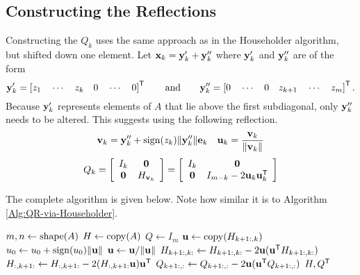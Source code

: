 \subsection*{Constructing the Reflections} %

Constructing the $Q_k$ uses the same approach as in the Householder algorithm, but shifted down one element.
Let $\mathbf{x}_k = \mathbf{y}_k' + \mathbf{y}_k''$ where $\mathbf{y}_k'$ and $\mathbf{y}_k''$ are of the form
\[
\mathbf{y}_k' = \left[z_1\quad \cdots\quad z_k\quad 0\quad \cdots\quad 0\right]^{\mathsf T}
\qquad\text{and}\qquad
\mathbf{y}_k'' = \left[0\quad\cdots\quad 0\quad z_{k+1}\quad\cdots\quad z_m\right]^{\mathsf T}.
\]
Because $\mathbf{y}_k'$ represents elements of $A$ that lie above the first subdiagonal, only $\mathbf{y}_k''$ needs to be altered.
This suggests using the following reflection.
%
\begin{align*}
\mathbf{v}_k = \mathbf{y}_k'' + \operatorname{sign}(z_k)\|\mathbf{y}_k''\| \mathbf{e}_k
&&
\mathbf{u}_k = \frac{\mathbf{v}_k}{\|\mathbf{v}_k\|}
\end{align*}
\[
Q_k =
\left[\begin{array}{cc}
I_k & \mathbf{0} \\
\mathbf{0}      & H_{\mathbf{v}_k} \\
\end{array}\right] =
\left[\begin{array}{cc}
I_k & \mathbf{0} \\
\mathbf{0}      & I_{m-k} - 2 \mathbf{u}_k\mathbf{u}_k^{\mathsf T} \\
\end{array}\right]
\]

The complete algorithm is given below.
Note how similar it is to Algorithm \ref{Alg:QR-via-Householder}.

\begin{algorithm}[H]
\begin{algorithmic}[1]
    \State $m, n \gets \mathrm{shape}(A)$
    \State $H \gets \mathrm{copy}(A)$
    \State $Q \gets I_{m}$
        \State $\mathbf{u} \gets \mathrm{copy}(H_{k+1:,k})$
        \State $u_0 \gets u_0 + \operatorname{sign}(u_0)\|\mathbf{u}\|$
        \State $\mathbf{u} \gets \mathbf{u}/\|\mathbf{u}\|$
        \State $H_{k+1:,k:} \gets H_{k+1:,k:} - 2\mathbf{u}(\mathbf{u}^{\mathsf T} H_{k+1:,k:})$
        \State $H_{:,k+1:} \gets H_{:,k+1:} - 2(H_{:,k+1:} \mathbf{u}) \mathbf{u}^{\mathsf T}$
        \State $Q_{k+1:,:} \gets Q_{k+1:,:} - 2\mathbf{u}(\mathbf{u}^{\mathsf T} Q_{k+1:,:})$
    \EndFor
    \State {} $H, Q^{\mathsf T}$
\EndProcedure
\end{algorithmic}
\caption{}
\label{Alg:Upper-Hessenberg-Form}
\end{algorithm}

